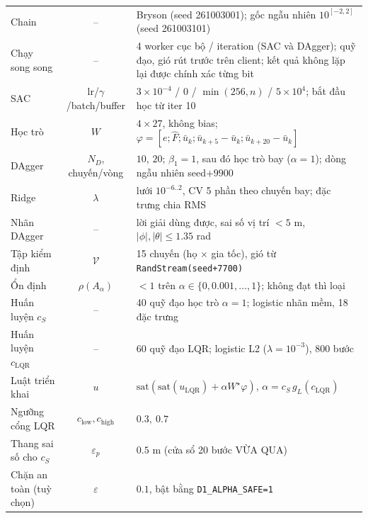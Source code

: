 \documentclass[11pt]{article}
\newcommand{\cS}{c_{S}}
\newcommand{\cL}{c_{\mathrm{LQR}}}
\newcommand{\uL}{u_{\mathrm{LQR}}}
\begin{document}
\begin{center}
\begin{tabular}{@{}p{5.2cm} c p{6.5cm}@{}}
Chain & -- & Bryson (seed 261003001); gốc ngẫu nhiên $10^{[-2,2]}$ (seed 261003101)\\
Chạy song song & -- & 4 worker cục bộ / iteration (SAC và DAgger); quỹ đạo, gió rút trước trên client;
kết quả không lặp lại được chính xác từng bit\\
SAC & lr/$\gamma$/batch/buffer & $3{\times}10^{-4}$ / 0 / $\min(256,n)$ / $5{\times}10^{4}$; bắt đầu học từ iter 10\\
Học trò & $W$ & $4\times27$, không bias; $\varphi=[e;\hat F;\bar u_k;\bar u_{k+5}-\bar u_k;\bar u_{k+20}-\bar u_k]$\\
DAgger & $N_D$, chuyến/vòng & $10$, $20$; $\beta_1=1$, sau đó học trò bay ($\alpha=1$); dòng ngẫu nhiên seed$+9900$\\
Ridge & $\lambda$ & lưới $10^{-6..2}$, CV 5 phần theo chuyến bay; đặc trưng chia RMS\\
Nhãn DAgger & -- & lời giải dùng được, sai số vị trí $<5$ m, $|\phi|,|\theta|\le1.35$ rad\\
Tập kiểm định & $\mathcal V$ & 15 chuyến (họ $\times$ gia tốc), gió từ \texttt{RandStream(seed+7700)}\\
Ổn định & $\rho(A_\alpha)$ & $<1$ trên $\alpha\in\{0,0.001,\dots,1\}$; không đạt thì loại\\
Huấn luyện $\cS$ & -- & 40 quỹ đạo học trò $\alpha=1$; logistic nhãn mềm, 18 đặc trưng\\
Huấn luyện $\cL$ & -- & 60 quỹ đạo LQR; logistic L2 ($\lambda=10^{-3}$), 800 bước\\
Luật triển khai & $u$ & $\mathrm{sat}(\mathrm{sat}(\uL)+\alpha W^\star\varphi)$, $\alpha=\cS\, g_L(\cL)$\\
Ngưỡng cổng LQR & $c_{\mathrm{low}},c_{\mathrm{high}}$ & $0.3,\ 0.7$\\
Thang sai số cho $\cS$ & $\varepsilon_p$ & $0.5$ m (cửa sổ 20 bước VỪA QUA)\\
Chặn an toàn (tuỳ chọn) & $\varepsilon$ & $0.1$, bật bằng \texttt{D1\_ALPHA\_SAFE=1}\\
\bottomrule
\end{tabular}
\end{center}

\end{document}
